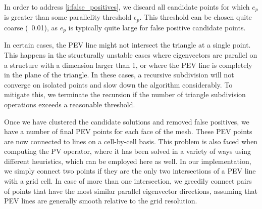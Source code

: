 %
In order to address \cref{i:false_positives}, we discard all candidate points
for which $e_p$ is greater than some parallelity threshold $\epsilon_p$.
%
This threshold can be chosen quite coarse (\eg~0.01), as $e_p$ is typically
quite large for false positive candidate points.
%


%
In certain cases, the \ac{PEV} line might not intersect the triangle at a single
point.
%
This happens in the structurally unstable cases where eigenvectors are parallel
on a structure with a dimension larger than 1, or where the \ac{PEV} line is
completely in the plane of the triangle.
%
In these cases, a recursive subdivision will not converge on isolated points and
slow down the algorithm considerably.
%
To mitigate this, we terminate the recursion if the number of triangle
subdivision operations exceeds a reasonable threshold.
%

%
Once we have clustered the candidate solutions and removed false positives, we
have a number of final \ac{PEV} points for each face of the mesh.
%
These \ac{PEV} points are now connected to lines on a cell-by-cell basis.
%
This problem is also faced when computing the \ac{PV} operator, where it has been
solved in a variety of ways using different heuristics, which can be employed
here as well.
%
In our implementation, we simply connect two points if they are the only
two intersections of a \ac{PEV} line with a grid cell.
%
In case of more than one intersection, we greedily connect pairs of points
that have the most similar parallel eigenvector directions, assuming that
\ac{PEV} lines are generally smooth relative to the grid resolution.
%
